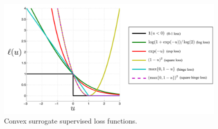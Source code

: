 \begin{figure}[tb]
\begin{center}
\includegraphics[width=0.99\textwidth]{figs/losses.pdf}
\caption[Convex surrogate supervised loss functions.]{Convex surrogate supervised loss functions.}
\label{fig:surrogates}
\end{center}
\end{figure}


